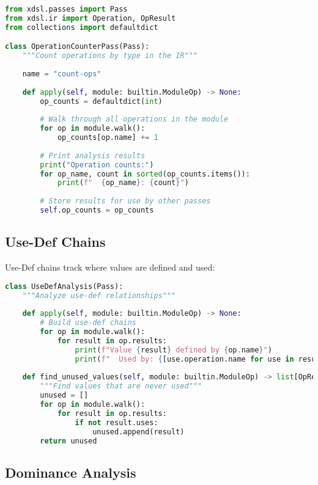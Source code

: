 \documentclass[11pt,a4paper]{article}
\begin{document}
\begin{lstlisting}[language=Python, caption=Operation Counter Analysis]
from xdsl.passes import Pass
from xdsl.ir import Operation, OpResult
from collections import defaultdict

class OperationCounterPass(Pass):
    """Count operations by type in the IR"""
    
    name = "count-ops"
    
    def apply(self, module: builtin.ModuleOp) -> None:
        op_counts = defaultdict(int)
        
        # Walk through all operations in the module
        for op in module.walk():
            op_counts[op.name] += 1
        
        # Print analysis results
        print("Operation counts:")
        for op_name, count in sorted(op_counts.items()):
            print(f"  {op_name}: {count}")
        
        # Store results for use by other passes
        self.op_counts = op_counts
\end{lstlisting}

\subsection{Use-Def Chains}

Use-Def chains track where values are defined and used:

\begin{lstlisting}[language=Python, caption=Use-Def Analysis]
class UseDefAnalysis(Pass):
    """Analyze use-def relationships"""
    
    def apply(self, module: builtin.ModuleOp) -> None:
        # Build use-def chains
        for op in module.walk():
            for result in op.results:
                print(f"Value {result} defined by {op.name}")
                print(f"  Used by: {[use.operation.name for use in result.uses]}")
    
    def find_unused_values(self, module: builtin.ModuleOp) -> list[OpResult]:
        """Find values that are never used"""
        unused = []
        for op in module.walk():
            for result in op.results:
                if not result.uses:
                    unused.append(result)
        return unused
\end{lstlisting}

\subsection{Dominance Analysis}
\end{document}
